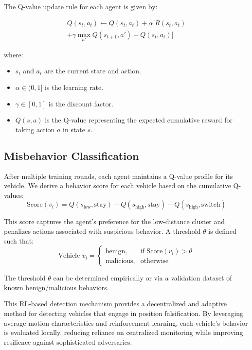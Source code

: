 \documentclass[conference]{IEEEtran}
\begin{document}
The Q-value update rule for each agent is given by:

\begin{equation*}
\begin{aligned}
Q(s_t, a_t) \leftarrow Q(s_t, a_t) + \alpha \Big[ R(s_t, a_t) \\
+ \gamma \max_{a'} Q(s_{t+1}, a') - Q(s_t, a_t) \Big]
\end{aligned}
\end{equation*}

where:
\begin{itemize}
    \item $s_t$ and $a_t$ are the current state and action.
    \item $\alpha \in (0, 1]$ is the learning rate.
    \item $\gamma \in [0, 1]$ is the discount factor.
    \item $Q(s, a)$ is the Q-value representing the expected cumulative reward for taking action $a$ in state $s$.
\end{itemize}

\subsection{Misbehavior Classification}

After multiple training rounds, each agent maintains a Q-value profile for its vehicle. We derive a behavior score for each vehicle based on the cumulative Q-values:
\[
\text{Score}(v_i) = Q(s_{\text{low}}, \text{stay}) - Q(s_{\text{high}}, \text{stay}) - Q(s_{\text{high}}, \text{switch})
\]

This score captures the agent’s preference for the low-distance cluster and penalizes actions associated with suspicious behavior. A threshold $\theta$ is defined such that:
\[
\text{Vehicle } v_i =
\begin{cases}
\text{benign}, & \text{if } \text{Score}(v_i) > \theta \\
\text{malicious}, & \text{otherwise}
\end{cases}
\]

The threshold $\theta$ can be determined empirically or via a validation dataset of known benign/malicious behaviors.

This RL-based detection mechanism provides a decentralized and adaptive method for detecting vehicles that engage in position falsification. By leveraging average motion characteristics and reinforcement learning, each vehicle's behavior is evaluated locally, reducing reliance on centralized monitoring while improving resilience against sophisticated adversaries.
\end{document}
